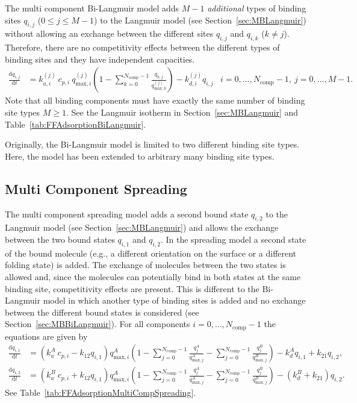 The multi component Bi-Langmuir model \cite{Guiochon2006} adds $M - 1$ \emph{additional} types of binding sites $q_{i,j}$ ($0 \leq j \leq M - 1$) to the Langmuir model (see Section~\ref{sec:MBLangmuir}) without allowing an exchange between the different sites $q_{i,j}$ and $q_{i,k}$ ($k \neq j$). 
Therefore, there are no competitivity effects between the different types of binding sites and they have independent capacities.
\begin{align*}
  \frac{\mathrm{d} q_{i,j}}{\mathrm{d} t} &=  k_{a,i}^{(j)}\: c_{p,i}\: q_{\text{max},i}^{(j)} \left( 1 - \sum_{k=0}^{N_{\text{comp}} - 1} \frac{q_{k,j}}{q_{\text{max},k}^{(j)}}\right) - k_{d,i}^{(j)} q_{i,j} & i = 0, \dots, N_{\text{comp}} - 1, \: j = 0, \dots, M - 1.%
\end{align*}
Note that all binding components must have exactly the same number of binding site types $M \geq 1$.
See the Langmuir isotherm in Section~\ref{sec:MBLangmuir} and Table~\ref{tab:FFAdsorptionBiLangmuir}.

Originally, the Bi-Langmuir model is limited to two different binding site types.
Here, the model has been extended to arbitrary many binding site types.

\subsection{Multi Component Spreading}

The multi component spreading model adds a second bound state $q_{i,2}$ to the Langmuir model (see Section~\ref{sec:MBLangmuir}) and allows the exchange between the two bound states $q_{i,1}$ and $q_{i,2}$. 
In the spreading model a second state of the bound molecule (e.g., a different orientation on the surface or a different folding state) is added.
The exchange of molecules between the two states is allowed and, since the molecules can potentially bind in both states at the same binding site, competitivity effects are present.
This is different to the Bi-Langmuir model in which another type of binding sites is added and no exchange between the different bound states is considered (see Section~\ref{sec:MBBiLangmuir}). For all components $i = 0, \dots, N_{\text{comp}} - 1$ the equations are given by
\begin{align*}
  \frac{\mathrm{d} q_{i,1}}{\mathrm{d} t} &= \left( k_a^A\: c_{p,i} - k_{12} q_{i,1} \right) q_{\text{max},i}^A \left( 1 - \sum_{j=0}^{N_{\text{comp}} - 1} \frac{q_j^A}{q_{\text{max},j}^A} - \sum_{j=0}^{N_{\text{comp}} - 1} \frac{q_j^B}{q_{\text{max},j}^B} \right) - k_d^A q_{i,1} + k_{21} q_{i,2}, \\
  \frac{\mathrm{d} q_{i,2}}{\mathrm{d} t} &= \left( k_a^B\: c_{p,i} + k_{12} q_{i,1} \right) q_{\text{max},i}^A \left( 1 - \sum_{j=0}^{N_{\text{comp}} - 1} \frac{q_j^A}{q_{\text{max},j}^A} - \sum_{j=0}^{N_{\text{comp}} - 1} \frac{q_j^B}{q_{\text{max},j}^B} \right) - \left( k_d^B + k_{21} \right) q_{i,2}.
\end{align*}
See Table~\ref{tab:FFAdsorptionMultiCompSpreading}.

